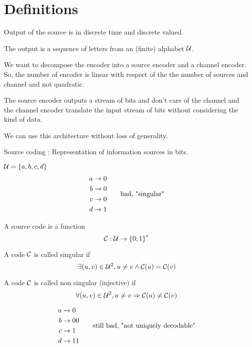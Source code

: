 \section{Definitions}
Output of the source is in discrete time and discrete valued.

\begin{definition}
    The output is a sequence of letters from an (finite) alphabet $\mathcal{U}$.
\end{definition}

We want to decompose the encoder into a source encoder and a channel encoder. So, the number of encoder is linear with respect of the the number of sources and channel and not quadratic.

The source encoder outputs a stream of bits and don't care of the channel and the channel encoder translate the input stream of bits without considering the kind of data.

We can use this architecture without loss of generality.

\bigskip

Source coding : Representation of information sources in bits.

\begin{example}
    $\mathcal{U} = \left\{ a,b,c,d \right\}$
    \[
        \begin{aligned}
            a &\rightarrow 0\\
            b &\rightarrow 0\\
            c &\rightarrow 0\\
            d &\rightarrow 1
        \end{aligned}
        \qquad \text{bad, "singular"}            
    \]
\end{example}

A source code is a function
\[
    \mathcal{C} : \mathcal{U} \rightarrow \left\{ 0;1 \right\}^*
\]

\begin{definition}
    A code $\mathcal{C}$ is called singular  if
    \[
        \exists (u,v) \in \mathcal{U}^2, u \neq v \wedge \mathcal{C}(u) = \mathcal{C}(v)
    \]
\end{definition}

\begin{definition}
    A code $\mathcal{C}$ is called non singular (injective) if
    \[
        \forall (u,v) \in \mathcal{U}^2, u \neq v \Rightarrow \mathcal{C}(u) \neq \mathcal{C}(v)
    \]
\end{definition}

\begin{example}
    \[
        \begin{aligned}
            a &\rightarrow 0\\
            b &\rightarrow 00\\
            c &\rightarrow 1\\
            d &\rightarrow 11
        \end{aligned}
        \qquad \text{still bad, "not uniquely decodable"}            
    \]
\end{example}

